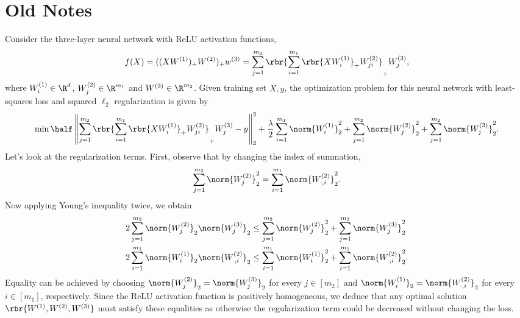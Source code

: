 \documentclass{article}
\newcommand{\wone}{W^{(1)}}
\newcommand{\wtwo}{W^{(2)}}
\newcommand{\wthree}{W^{(3)}}
\begin{document}
\newpage

\section{Old Notes}

Consider the three-layer neural network with ReLU activation functions,
\begin{equation}
    \label{eq:three-layer-mlp}
    f(X)
    = ((X W^{(1)})_+ W^{(2)})_+ w^{(3)}
    = \sum_{j = 1}^{m_2} \rbr{\sum_{i = 1}^{m_1} \rbr{X \wone_i}_+ \wtwo_{ji}}_+ \wthree_j,
\end{equation}
where \( \wone_i \in \R^{d} \), \( \wtwo_j \in \R^{m_1} \) and \( \wthree \in \R^{m_2} \).
Given training set \( X, y \), the optimization problem for this neural network
with least-squares loss and squared \( \ell_2 \) regularization is given by
\begin{equation}
    \label{eq:three-layer-problem}
    \min
    \half \left\|
    \sum_{j = 1}^{m_2} \rbr{\sum_{i = 1}^{m_1} \rbr{X \wone_i}_+ \wtwo_{ji}}_+ \wthree_j
    - y
    \right\|_2^2
    + \frac{\lambda}{2}
    \sum_{i=1}^{m_1} \norm{\wone_i}_2^2
    + \sum_{j=1}^{m_2} \norm{\wtwo_j}_2^2
    + \sum_{j=1}^{m_2} \norm{\wthree_j}_2^2.
\end{equation}
Let's look at the regularization terms.
First, observe that by changing the index of summation, \[ \sum_{j=1}^{m_2}
    \norm{\wtwo_j}_2^2 = \sum_{i=1}^{m_1} \norm{\wtwo_{\cdot, i}}_2^2.
\]
Now applying Young's inequality twice, we obtain
\begin{align*}
    2 \sum_{j = 1}^{m_2} \norm{\wtwo_j}_2 \norm{\wthree_j}_2
     & \leq \sum_{j=1}^{m_2} \norm{\wtwo_j}_2^2
    + \sum_{j=1}^{m_2} \norm{\wthree_j}_2^2     \\
    2 \sum_{i = 1}^{m_1} \norm{\wone_i}_2 \norm{\wtwo_{\cdot, i}}_2
     & \leq \sum_{i=1}^{m_1} \norm{\wone_i}_2^2
    + \sum_{i=1}^{m_1} \norm{\wtwo_{\cdot, i}}_2^2.
\end{align*}
Equality can be achieved by choosing \( \norm{\wtwo_j}_2 = \norm{\wthree_j}_2
\) for every \( j \in [m_2] \) and \( \norm{\wone_i}_2 = \norm{\wtwo_{\cdot,
        i}}_2 \) for every \( i \in [m_1] \), respectively.
Since the ReLU activation function is positively homogeneous, we deduce that
any optimal solution \( \rbr{\wone, \wtwo, \wthree} \) must satisfy these
equalities as otherwise the regularization term could be decreased without
changing the loss.
\end{document}
